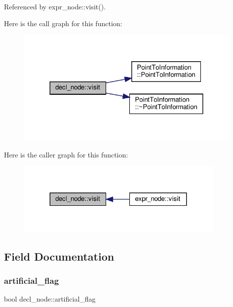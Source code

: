 Referenced by expr\+\_\+node\+::visit().

Here is the call graph for this function\+:
\nopagebreak
\begin{figure}[H]
\begin{center}
\leavevmode
\includegraphics[width=312pt]{d0/d42/structdecl__node_a9e63331f0c35d9af9d1997afafe9152a_cgraph}
\end{center}
\end{figure}
Here is the caller graph for this function\+:
\nopagebreak
\begin{figure}[H]
\begin{center}
\leavevmode
\includegraphics[width=287pt]{d0/d42/structdecl__node_a9e63331f0c35d9af9d1997afafe9152a_icgraph}
\end{center}
\end{figure}


\subsection{Field Documentation}
\mbox{\label{structdecl__node_a99bf581d9245483b7fa402072094835b}} 
\subsubsection{\texorpdfstring{artificial\+\_\+flag}{artificial\_flag}}
{\footnotesize\ttfamily bool decl\+\_\+node\+::artificial\+\_\+flag}



